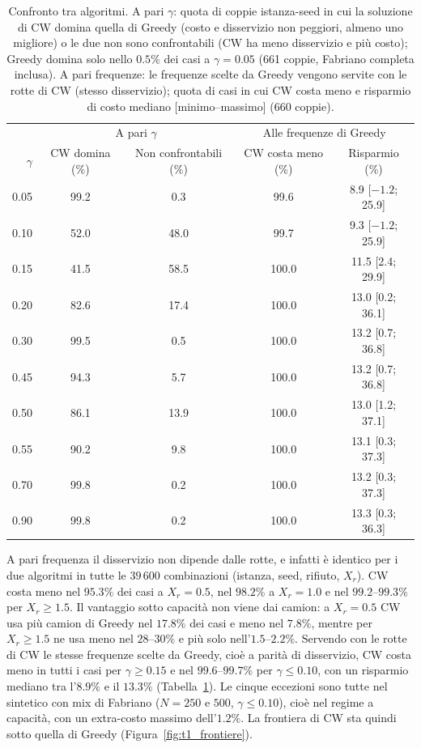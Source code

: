 \begin{table}[htbp]
	\centering
	\caption{Confronto tra algoritmi. A pari $\gamma$: quota di coppie istanza-seed in cui la soluzione di CW domina quella di Greedy (costo e disservizio non peggiori, almeno uno migliore) o le due non sono confrontabili (CW ha meno disservizio e più costo); Greedy domina solo nello $0.5\%$ dei casi a $\gamma=0.05$ (661 coppie, Fabriano completa inclusa). A pari frequenze: le frequenze scelte da Greedy vengono servite con le rotte di CW (stesso disservizio); quota di casi in cui CW costa meno e risparmio di costo mediano [minimo--massimo] (660 coppie).}
	\label{tab:t1_algoritmi}
	\small
	\begin{tabular}{rcccc}
		\hline
		& \multicolumn{2}{c}{A pari $\gamma$} & \multicolumn{2}{c}{Alle frequenze di Greedy} \\
		$\gamma$ & CW domina (\%) & Non confrontabili (\%) & CW costa meno (\%) & Risparmio (\%) \\
		\hline
		0.05 & 99.2  & 0.3  & 99.6  & 8.9 [$-1.2$; 25.9] \\
		0.10 & 52.0  & 48.0 & 99.7  & 9.3 [$-1.2$; 25.9] \\
		0.15 & 41.5  & 58.5 & 100.0 & 11.5 [2.4; 29.9] \\
		0.20 & 82.6  & 17.4 & 100.0 & 13.0 [0.2; 36.1] \\
		0.30 & 99.5  & 0.5  & 100.0 & 13.2 [0.7; 36.8] \\
		0.45 & 94.3  & 5.7  & 100.0 & 13.2 [0.7; 36.8] \\
		0.50 & 86.1  & 13.9 & 100.0 & 13.0 [1.2; 37.1] \\
		0.55 & 90.2  & 9.8  & 100.0 & 13.1 [0.3; 37.3] \\
		0.70 & 99.8  & 0.2  & 100.0 & 13.2 [0.3; 37.3] \\
		0.90 & 99.8  & 0.2  & 100.0 & 13.3 [0.3; 36.3] \\
		\hline
	\end{tabular}
\end{table}

A pari frequenza il disservizio non dipende dalle rotte, e infatti è identico per i due algoritmi in tutte le $39\,600$ combinazioni (istanza, seed, rifiuto, $X_r$). CW costa meno nel $95.3\%$ dei casi a $X_r=0.5$, nel $98.2\%$ a $X_r=1.0$ e nel $99.2$--$99.3\%$ per $X_r\ge1.5$. Il vantaggio sotto capacità non viene dai camion: a $X_r=0.5$ CW usa più camion di Greedy nel $17.8\%$ dei casi e meno nel $7.8\%$, mentre per $X_r\ge1.5$ ne usa meno nel $28$--$30\%$ e più solo nell'$1.5$--$2.2\%$. Servendo con le rotte di CW le stesse frequenze scelte da Greedy, cioè a parità di disservizio, CW costa meno in tutti i casi per $\gamma\ge0.15$ e nel $99.6$--$99.7\%$ per $\gamma\le0.10$, con un risparmio mediano tra l'$8.9\%$ e il $13.3\%$ (Tabella~\ref{tab:t1_algoritmi}). Le cinque eccezioni sono tutte nel sintetico con mix di Fabriano ($N=250$ e $500$, $\gamma\le0.10$), cioè nel regime a capacità, con un extra-costo massimo dell'$1.2\%$. La frontiera di CW sta quindi sotto quella di Greedy (Figura~\ref{fig:t1_frontiere}).

